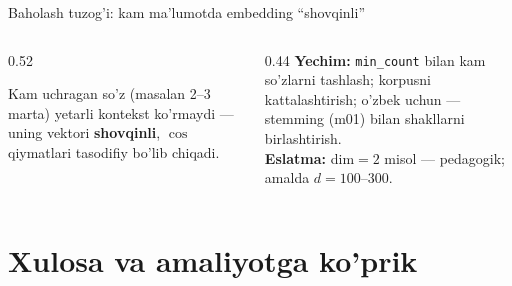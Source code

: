 \documentclass[aspectratio=169,11pt]{beamer}
\begin{document}
\begin{frame}{Baholash tuzog'i: kam ma'lumotda embedding ``shovqinli''}
  \begin{columns}[T]
    \begin{column}{0.52\textwidth}
      \begin{tcolorbox}[warnbox,title=Kam korpus = ishonchsiz vektor]
        \small
        Kam uchragan so'z (masalan 2--3 marta) yetarli kontekst ko'rmaydi ---
        uning vektori \textbf{shovqinli}, $\cos$ qiymatlari tasodifiy bo'lib
        chiqadi.
      \end{tcolorbox}
    \end{column}
    \begin{column}{0.44\textwidth}
      \footnotesize
      \textbf{Yechim:} \texttt{min\_count} bilan kam so'zlarni tashlash; korpusni
      kattalashtirish; o'zbek uchun --- stemming (m01) bilan shakllarni
      birlashtirish.\\[4pt]
      \textbf{Eslatma:} dim$=2$ misol --- pedagogik; amalda $d=100$--$300$.
    \end{column}
  \end{columns}
\end{frame}

\section[Xulosa]{Xulosa va amaliyotga ko'prik}
\end{document}
